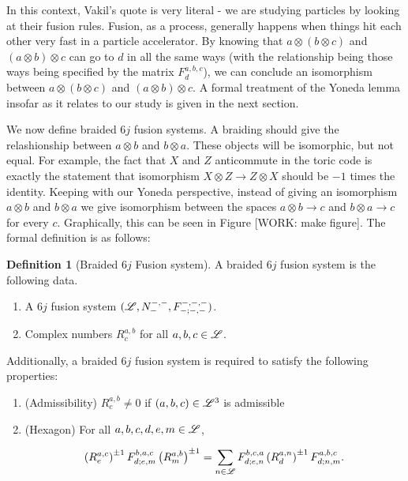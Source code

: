 \documentclass{article}
\theoremstyle{definition}
\newtheorem*{definition}{Definition}
\numberwithin{figure}{section}
\begin{document}
In this context, Vakil's quote is very literal - we are studying particles by looking at their fusion rules. Fusion, as a process, generally happens when things hit each other very fast in a particle accelerator. By knowing that $a\otimes (b\otimes c)$ and $(a\otimes b)\otimes c$ can go to $d$ in all the same ways (with the relationship being those ways being specified by the matrix $F^{a,b,c}_d$), we can conclude an isomorphism between $a\otimes (b\otimes c)$ and $(a\otimes b)\otimes c$. A formal treatment of the Yoneda lemma insofar as it relates to our study is given in the next section.

We now define braided $6j$ fusion systems. A braiding should give the relashionship between $a\otimes b$ and $b\otimes a$. These objects will be isomorphic, but not equal. For example, the fact that $X$ and $Z$ anticommute in the toric code is exactly the statement that isomorphism $X\otimes Z\to Z\otimes X$ should be $-1$ times the identity. Keeping with our Yoneda perspective, instead of giving an isomorphism $a\otimes b$ and $b\otimes a$ we give isomorphism between the spaces $a\otimes b\to c$ and $b\otimes a\to c$ for every $c$. Graphically, this can be seen in Figure [WORK: make figure]. The formal definition is as follows:

\begin{definition}[Braided $6j$ Fusion system] A braided $6j$ fusion system is the following data.

\begin{enumerate}
\item A $6j$ fusion system $(\mathscr{L}, N_{\--}^{\--,\--},F^{\--,\--,\--}_{\--;\--,\--})$.
\item Complex numbers $R^{a,b}_{c}$ for all $a,b,c\in \mathscr{L}$.
\end{enumerate}

Additionally, a braided $6j$ fusion system is required to satisfy the following properties:

\begin{enumerate}

\item (Admissibility) $R^{a,b}_{c}\neq 0$ if $(a,b,c)\in \mathscr{L}^3$ is admissible

\item (Hexagon) For all $a,b,c,d,e,m\in\mathscr{L}$,

$$\left(R^{a,c}_{e}\right)^{\pm 1}F^{b,a,c}_{d;e,m}\left(R^{a,b}_{m}\right)^{\pm 1}=\sum_{n\in \mathscr{L}} F^{b,c,a}_{d;e,n}\left(R^{a,n}_{d}\right)^{\pm 1}F^{a,b,c}_{d;n,m}.$$
\end{enumerate}
\raggedleft\qedsymbol{}
\end{definition}
\end{document}
